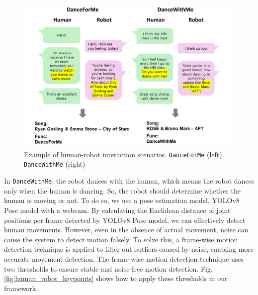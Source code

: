 \documentclass[letterpaper, 10 pt, conference]{ieeeconf}  %
\begin{document}
\begin{figure}[h]
    \centering
    \includegraphics[width=\linewidth]{figures/figure_scenario.jpg}
    \caption{Example of human-robot interaction scenarios. \texttt{DanceForMe} (left). \texttt{DanceWithMe} (right)}\label{fig:hri_scenario}
\end{figure}

In \texttt{DanceWithMe}, the robot dances with the human, which means the robot dances only when the human is dancing. So, the robot should determine whether the human is moving or not. To do so, we use a pose estimation model, YOLOv8 Pose model \cite{Jocher_Ultralytics_YOLO_2023} with a webcam. By calculating the Euclidean distance of joint positions per frame detected by YOLOv8 Pose model, we can effectively detect human movements. However, even in the absence of actual movement, noise can cause the system to detect motion falsely. To solve this, a frame-wise motion detection technique is applied to filter out outliers caused by noise, enabling more accurate movement detection. The frame-wise motion detection technique uses two thresholds to ensure stable and noise-free motion detection. Fig. \ref{fig:human_robot_keypoints} shows how to apply these thresholds in our framework.
\end{document}
